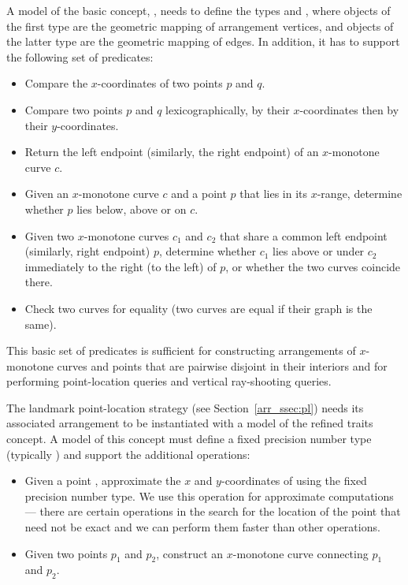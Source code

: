 A model of the basic concept, ,
needs to define the types  and
, where objects of the first type are
the geometric mapping of arrangement vertices, and objects of the
latter type are the geometric mapping of edges. In addition, it has to
support the following set of predicates:
\begin{itemize}
\item Compare the $x$-coordinates of two points $p$ and $q$.
\item Compare two points $p$ and $q$ lexicographically, by their
$x$-coordinates then by their $y$-coordinates.
\item Return the left endpoint (similarly, the right endpoint) of
an $x$-monotone curve $c$.
\item Given an $x$-monotone curve $c$ and a point $p$ that lies in its
$x$-range, determine whether $p$ lies below, above or on $c$.
\item Given two $x$-monotone curves $c_1$ and $c_2$ that share a
common left endpoint (similarly, right endpoint) $p$, determine
whether $c_1$ lies above or under $c_2$ immediately to the right
(to the left) of $p$, or whether the two curves coincide there.
\item Check two curves for equality (two curves are equal if their
graph is the same).
\end{itemize}
This basic set of predicates is sufficient for constructing
arrangements of $x$-monotone curves and points that are pairwise
disjoint in their interiors and for performing point-location
queries and vertical ray-shooting queries.

The landmark point-location strategy (see
Section~\ref{arr_ssec:pl}) needs its associated arrangement to be
instantiated with a model of the refined
 traits concept. A model of this
concept must define a fixed precision number type (typically
) and support the additional operations:
\begin{itemize}
\item Given a point , approximate the $x$ and $y$-coordinates
of  using the fixed precision number type. We use this operation
for approximate computations --- there are certain operations in the
search for the location of the point that need not be exact and we can
perform them faster than other operations. 
\item Given two points $p_1$ and $p_2$, construct an $x$-monotone
curve connecting $p_1$ and $p_2$.
\end{itemize}

